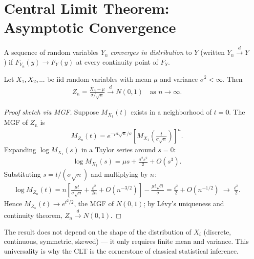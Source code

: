 \section{Central Limit Theorem: Asymptotic Convergence}

\begin{definicion}
A sequence of random variables $Y_n$ \emph{converges in distribution} to $Y$ (written $Y_n \xrightarrow{d} Y$) if $F_{Y_n}(y) \to F_Y(y)$ at every continuity point of $F_Y$.
\end{definicion}

\begin{teorema}
 \label{eq:5.2.1}
Let $X_1, X_2, \ldots$ be iid random variables with mean $\mu$ and variance $\sigma^2 < \infty$. Then
\begin{align}
 Z_n = \frac{\bar{X}_n - \mu}{\sigma/\sqrt{n}} \xrightarrow{d} N(0,1)
 \quad \text{as } n \to \infty.
\end{align}
\end{teorema}

\begin{proof}[Proof sketch via MGF]
Suppose $M_{X_1}(t)$ exists in a neighborhood of $t=0$. The MGF of $Z_n$ is
\begin{align}
 M_{Z_n}(t) = e^{-\mu t \sqrt{n}/\sigma}\left[M_{X_1}\!\left(\frac{t}{\sigma\sqrt{n}}\right)\right]^n.
\end{align}
Expanding $\log M_{X_1}(s)$ in a Taylor series around $s=0$:
\begin{align}
 \log M_{X_1}(s) = \mu s + \frac{\sigma^2 s^2}{2} + O(s^3).
\end{align}
Substituting $s = t/(\sigma\sqrt{n})$ and multiplying by $n$:
\begin{align}
 \log M_{Z_n}(t) = n\left[\frac{\mu t}{\sigma\sqrt{n}} + \frac{t^2}{2n} + O(n^{-3/2})\right]
 - \frac{\mu t\sqrt{n}}{\sigma} = \frac{t^2}{2} + O(n^{-1/2}) \;\longrightarrow\; \frac{t^2}{2}.
\end{align}
Hence $M_{Z_n}(t) \to e^{t^2/2}$, the MGF of $N(0,1)$; by L\'evy's uniqueness and continuity theorem, $Z_n \xrightarrow{d} N(0,1)$.
\end{proof}

\begin{observacion}
The result does not depend on the shape of the distribution of $X_i$ (discrete, continuous, symmetric, skewed) --- it only requires finite mean and variance. This universality is why the CLT is the cornerstone of classical statistical inference.
\end{observacion}

